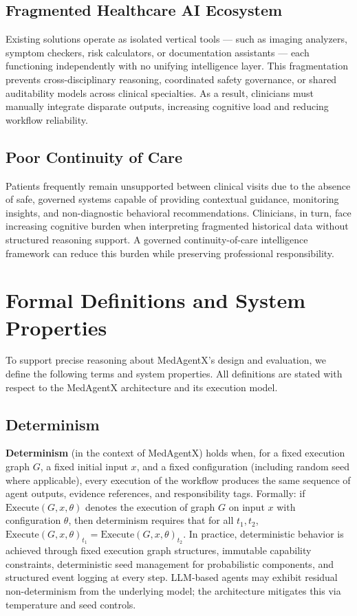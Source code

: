 \documentclass[journal]{IEEEtran}
\begin{document}
\subsection{Fragmented Healthcare AI Ecosystem}
Existing solutions operate as isolated vertical tools — such as imaging analyzers, symptom checkers, risk calculators, or documentation assistants — each functioning independently with no unifying intelligence layer. This fragmentation prevents cross-disciplinary reasoning, coordinated safety governance, or shared auditability models across clinical specialties. As a result, clinicians must manually integrate disparate outputs, increasing cognitive load and reducing workflow reliability.

\subsection{Poor Continuity of Care}
Patients frequently remain unsupported between clinical visits due to the absence of safe, governed systems capable of providing contextual guidance, monitoring insights, and non-diagnostic behavioral recommendations. Clinicians, in turn, face increasing cognitive burden when interpreting fragmented historical data without structured reasoning support. A governed continuity-of-care intelligence framework can reduce this burden while preserving professional responsibility.

\section{Formal Definitions and System Properties}
\label{sec:formal}
To support precise reasoning about MedAgentX's design and evaluation, we define the following terms and system properties. All definitions are stated with respect to the MedAgentX architecture and its execution model.

\subsection{Determinism}
\textbf{Determinism} (in the context of MedAgentX) holds when, for a fixed execution graph $G$, a fixed initial input $x$, and a fixed configuration (including random seed where applicable), every execution of the workflow produces the same sequence of agent outputs, evidence references, and responsibility tags. Formally: if $\text{Execute}(G, x, \theta)$ denotes the execution of graph $G$ on input $x$ with configuration $\theta$, then determinism requires that for all $t_1, t_2$, $\text{Execute}(G, x, \theta)_{t_1} = \text{Execute}(G, x, \theta)_{t_2}$. In practice, deterministic behavior is achieved through fixed execution graph structures, immutable capability constraints, deterministic seed management for probabilistic components, and structured event logging at every step. LLM-based agents may exhibit residual non-determinism from the underlying model; the architecture mitigates this via temperature and seed controls.
\end{document}
